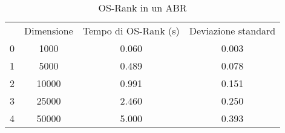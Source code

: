 \begin{table}[H]
\centering
\caption{OS-Rank in un ABR}
\label{OS-Rank in un ABR}
\begin{tabular}{cccc}
 & Dimensione & Tempo di OS-Rank (s) & Deviazione standard \\
0 & 1000 & 0.060 & 0.003 \\
\cline{1-4}
1 & 5000 & 0.489 & 0.078 \\
\cline{1-4}
2 & 10000 & 0.991 & 0.151 \\
\cline{1-4}
3 & 25000 & 2.460 & 0.250 \\
\cline{1-4}
4 & 50000 & 5.000 & 0.393 \\
\cline{1-4}
\end{tabular}
\end{table}
